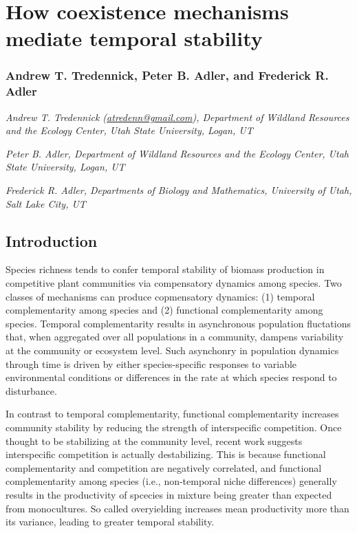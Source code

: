\documentclass[12pt,]{article}
\author{}
\date{}
\begin{document}
\normalsize


\section{How coexistence mechanisms mediate temporal
stability}\label{how-coexistence-mechanisms-mediate-temporal-stability}

\subsubsection{Andrew T. Tredennick, Peter B. Adler, and Frederick R.
Adler}\label{andrew-t.-tredennick-peter-b.-adler-and-frederick-r.-adler}

\emph{Andrew T. Tredennick
(\href{mailto:atredenn@gmail.com}{\href{mailto:atredenn@gmail.com}{atredenn@gmail.com}}),
Department of Wildland Resources and the Ecology Center, Utah State
University, Logan, UT}

\emph{Peter B. Adler, Department of Wildland Resources and the Ecology
Center, Utah State University, Logan, UT}

\emph{Frederick R. Adler, Departments of Biology and Mathematics,
University of Utah, Salt Lake City, UT}

\subsection{Introduction}\label{introduction}

Species richness tends to confer temporal stability of biomass
production in competitive plant communities via compensatory dynamics
among species. Two classes of mechanisms can produce copmensatory
dynamics: (1) temporal complementarity among species and (2) functional
complementarity among species. Temporal complementarity results in
asynchronous population fluctations that, when aggregated over all
populations in a community, dampens variability at the community or
ecosystem level. Such asynchonry in population dynamics through time is
driven by either species-specific responses to variable environmental
conditions or differences in the rate at which species respond to
disturbance.

In contrast to temporal complementarity, functional complementarity
increases community stability by reducing the strength of interspecific
competition. Once thought to be stabilizing at the community level,
recent work suggests interspecific competition is actually
destabilizing. This is because functional complementarity and
competition are negatively correlated, and functional complementarity
among species (i.e., non-temporal niche differences) generally results
in the productivity of spcecies in mixture being greater than expected
from monocultures. So called overyielding increases mean productivity
more than its variance, leading to greater temporal stability.
\end{document}
